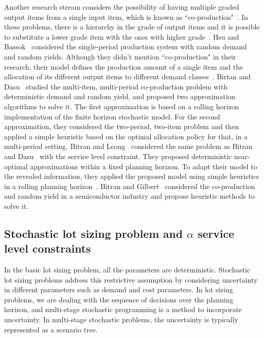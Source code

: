 \documentclass[10pt]{article}
\begin{document}
Another research stream considers the possibility of having multiple graded output items from a single input item, which is known as ``co-production"~\cite{ng2012robust}. In these problems, there is a hierarchy in the grade of output items and it is possible to substitute a lower grade item with the ones with higher grade~\cite{bitran1992ordering}. Hsu and Bassok~\cite{hsu1999random} considered the single-period production system with random demand  and random yields. Although they didn't mention ``co-production" in their research, their model defines the production amount of a single item and the allocation of its different output items to different demand classes~\cite{hsu1999random}.
Birtan and Dasu~\cite{bitran1992ordering} studied the multi-item, multi-period co-production problem with deterministic demand and random yield, and proposed two approximation algorithms to solve it. The first approximation is based on a rolling horizon implementation of the finite horizon stochastic model. For the second approximation, they considered the two-period, two-item problem and then applied a simple heuristic based on the optimal allocation policy for that, in a multi-period setting. Bitran and Leong~\cite{bitran1992deterministic} considered the same problem as Bitran and Dasu~\cite{bitran1992ordering} with the service level constraint. They proposed deterministic near-optimal approximations within a fixed planning horizon. To adapt their model to the revealed information, they applied the proposed model using simple heuristics in a rolling planning horizon~\cite{bitran1992deterministic}.  Bitran and Gilbert~\cite{bitran1994co} considered the co-production and random yield in a semiconductor industry and propose heuristic methods to solve it. 
 
\subsection{Stochastic lot sizing problem and $\alpha$ service level constraints}
In the basic lot sizing problem, all the parameters are deterministic. Stochastic lot sizing problems address this restrictive assumption by considering uncertainty in different parameters such as demand and cost parameters. In lot sizing problems, we are dealing with the sequence of decisions over the planning horizon, and multi-stage stochastic programming is a method to incorporate uncertainty. In multi-stage stochastic problems, the uncertainty is typically represented as a scenario tree. 
\end{document}
